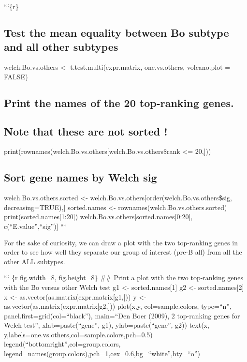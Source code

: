 ```\{r\}

\subsection{Test the mean equality between Bo subtype and all other
subtypes}\label{test-the-mean-equality-between-bo-subtype-and-all-other-subtypes}

welch.Bo.vs.others \textless{}- t.test.multi(expr.matrix, one.vs.others,
volcano.plot = FALSE)

\subsection{Print the names of the 20 top-ranking
genes.}\label{print-the-names-of-the-20-top-ranking-genes.}

\subsection{Note that these are not sorted
!}\label{note-that-these-are-not-sorted}

print(rownames(welch.Bo.vs.others{[}welch.Bo.vs.others\$rank
\textless{}= 20,{]}))

\subsection{Sort gene names by Welch
sig}\label{sort-gene-names-by-welch-sig}

welch.Bo.vs.others.sorted \textless{}-
welch.Bo.vs.others{[}order(welch.Bo.vs.others\$sig, decreasing=TRUE),{]}
sorted.names \textless{}- rownames(welch.Bo.vs.others.sorted)
print(sorted.names{[}1:20{]})
welch.Bo.vs.others{[}sorted.names{[}0:20{]}, c(``E.value'',``sig''){]}
```

For the sake of curiosity, we can draw a plot with the two top-ranking
genes in order to see how well they separate our group of interest
(pre-B all) from all the other ALL subtypes.

``` \{r fig.width=8, fig.height=8\} \#\# Print a plot with the two
top-ranking genes with the Bo versus other Welch test g1 \textless{}-
sorted.names{[}1{]} g2 \textless{}- sorted.names{[}2{]} x \textless{}-
as.vector(as.matrix(expr.matrix{[}g1,{]})) y \textless{}-
as.vector(as.matrix(expr.matrix{[}g2,{]})) plot(x,y, col=sample.colors,
type=``n'', panel.first=grid(col=``black''), main=``Den Boer (2009), 2
top-ranking genes for Welch test'', xlab=paste(``gene'', g1),
ylab=paste(``gene'', g2)) text(x,
y,labels=one.vs.others,col=sample.colors,pch=0.5)
legend(``bottomright'',col=group.colors,
legend=names(group.colors),pch=1,cex=0.6,bg=``white'',bty=``o'')

